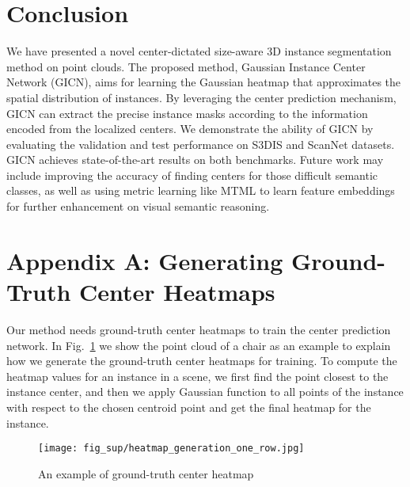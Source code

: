 \documentclass[runningheads]{llncs}
\begin{document}
\section{Conclusion}
We have presented a novel center-dictated size-aware 3D instance segmentation method on point clouds. The proposed method, Gaussian Instance Center Network (GICN), aims for learning the Gaussian heatmap that approximates the spatial distribution of instances. By leveraging the center prediction mechanism, GICN can extract the precise instance masks according to the information encoded from the localized centers. We demonstrate the ability of GICN by evaluating the validation and test performance on S3DIS and ScanNet datasets. GICN achieves state-of-the-art results on both benchmarks. Future work may include improving the accuracy of finding centers for those difficult semantic classes, as well as using metric learning like MTML \cite{LahoudGPO19} to learn feature embeddings for further enhancement on visual semantic reasoning. 




\section*{Appendix A: Generating Ground-Truth Center Heatmaps}
Our method needs ground-truth center heatmaps to train the center prediction network. In Fig.~\ref{fig:heatmap_generate} we show the point cloud of a chair as an example to explain how we generate the ground-truth center heatmaps for training. To compute the heatmap values for an instance in a scene, we first find the point closest to the instance center, and then we apply Gaussian function to all points of the instance with respect to the chosen centroid point and get the final heatmap for the instance.

\begin{figure}[tbh]
\centering
\begin{center}
 \texttt{[image: fig\_sup/heatmap\_generation\_one\_row.jpg]}
   \vspace{-5mm}
   \caption{An example of ground-truth center heatmap}
\label{fig:heatmap_generate}
\end{center}
\end{figure}

\vspace{-10mm}
\end{document}
